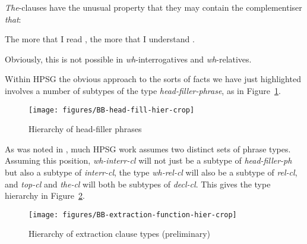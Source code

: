 \documentclass[output=paper
,notxmath 
 	        ,biblatex
                ,babelshorthands
                ,newtxmath
                ,draftmode
                ,colorlinks, citecolor=brown
]{langscibook}
\begin{document}
\noindent
\emph{The}-clauses have the unusual property that they may contain
the complementiser \emph{that}:

\begin{exe}
\ex \label{ex:UDC:46}
The more that I read \trace{}, the more that I understand \trace{}.
\end{exe}

\noindent
Obviously, this is not possible in \emph{wh}-interrogatives and
\emph{wh}-relatives.

\begin{exe} \ex \begin{xlist} \label{ex:UDC:47}

\end{xlist}
\end{exe}

\noindent
Within HPSG the obvious approach to the sorts of facts we have just
highlighted involves a number of subtypes of the type
\emph{head-filler-phrase}, as in Figure~\ref{fig:UDC:48}.


\begin{figure}
  \centering

  \texttt{[image: figures/BB-head-fill-hier-crop]}
  \caption{\label{fig:UDC:48}Hierarchy of head-filler phrases}
  
\end{figure}


As was noted in , much HPSG work assumes two distinct sets of
phrase types. Assuming this position, \emph{wh-interr-cl} will not just
be a subtype of \emph{head-filler-ph} but also a subtype of
\emph{interr-cl}, the type \emph{wh-rel-cl} will also be a subtype of
\emph{rel-cl}, and \emph{top-cl} and \emph{the-cl} will both be subtypes
of \emph{decl-cl}. This gives the type hierarchy in Figure~\ref{fig:UDC:49}.

\begin{figure}
  \centering

  \texttt{[image: figures/BB-extraction-function-hier-crop]}
  \caption{\label{fig:UDC:49}Hierarchy of extraction clause types (preliminary)}
  
\end{figure}
\end{document}
